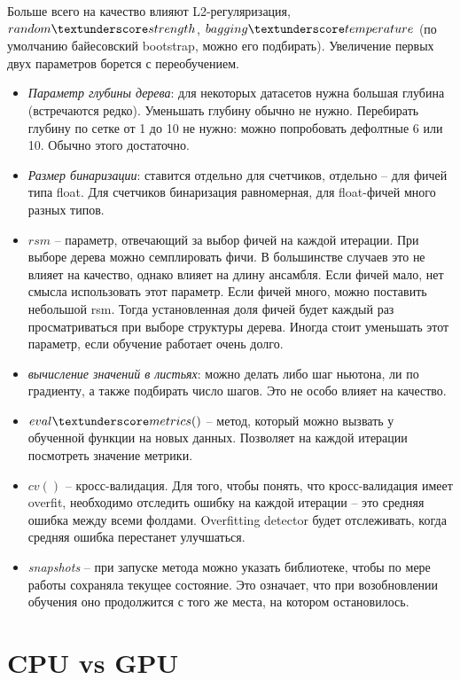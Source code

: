 \documentclass[a4paper,12pt]{article}
\begin{document}
Больше всего на качество влияют L2-регуляризация, $random \textunderscore strength$, 
$bagging \textunderscore temperature$ (по умолчанию байесовский bootstrap, можно его подбирать). Увеличение первых двух параметров борется с переобучением. 

\begin{itemize}[noitemsep]
\item \textit{Параметр глубины дерева}: для некоторых датасетов нужна большая глубина (встречаются редко). Уменьшать глубину обычно не нужно. Перебирать глубину по сетке от 1 до 10 не нужно: можно попробовать дефолтные 6 или 10. Обычно этого достаточно.
\item \textit{Размер бинаризации}: ставится отдельно для счетчиков, отдельно – для фичей типа float. Для счетчиков бинаризация равномерная, для float-фичей много разных типов. 
\item $rsm$ – параметр, отвечающий за выбор фичей на каждой итерации. При выборе дерева можно семплировать фичи. В большинстве случаев это не влияет на качество, однако влияет на длину ансамбля. Если фичей мало, нет смысла использовать этот параметр. Если фичей много, можно поставить небольшой rsm. Тогда установленная доля фичей будет каждый раз просматриваться при выборе структуры дерева. Иногда стоит уменьшать этот параметр, если обучение работает очень долго. 
\item \textit{вычисление значений в листьях}: можно делать либо шаг ньютона, ли по градиенту, а также подбирать число шагов. Это не особо влияет на качество.
\item $eval\textunderscore metrics()$ – метод, который можно вызвать у обученной функции на новых данных. Позволяет на каждой итерации посмотреть значение метрики. 
\item $cv()$ – кросс-валидация. Для того, чтобы понять, что кросс-валидация имеет overfit, необходимо отследить ошибку на каждой итерации – это средняя ошибка между всеми фолдами. Overfitting detector будет отслеживать, когда средняя ошибка перестанет улучшаться. 
\item \textit{snapshots} – при запуске метода можно указать библиотеке, чтобы по мере работы сохраняла текущее состояние. Это означает, что при возобновлении обучения оно продолжится с того же места, на котором остановилось.
\end{itemize}

\section{CPU vs GPU}
\end{document}
